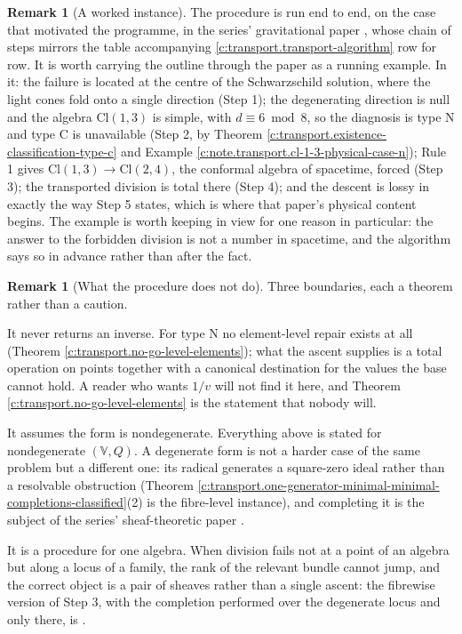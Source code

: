 \documentclass[11pt]{article}
\theoremstyle{definition}
\newtheorem{remark}[theorem]{Remark}
\theoremstyle{plain}
\providecommand{\Cl}{}\renewcommand{\Cl}{\mathrm{Cl}}
\begin{document}
\begin{remark}[A worked instance]\label{c:note.transport.worked-instance}
The procedure is run end to end, on the case that motivated the programme, in the series' gravitational paper \cite{ButlerT5}, whose chain of steps mirrors the table accompanying \ref{c:transport.transport-algorithm} row for row. It is worth carrying the outline through the paper as a running example. In it: the failure is located at the centre of the Schwarzschild solution, where the light cones fold onto a single direction (Step 1); the degenerating direction is null and the algebra $\Cl(1,3)$ is simple, with $d \equiv 6 \bmod 8$, so the diagnosis is type N and type C is unavailable (Step 2, by Theorem \ref{c:transport.existence-classification-type-c} and Example \ref{c:note.transport.cl-1-3-physical-case-n}); Rule 1 gives $\Cl(1,3) \to \Cl(2,4)$, the conformal algebra of spacetime, forced (Step 3); the transported division is total there (Step 4); and the descent is lossy in exactly the way Step 5 states, which is where that paper's physical content begins. The example is worth keeping in view for one reason in particular: the answer to the forbidden division is not a number in spacetime, and the algorithm says so in advance rather than after the fact.
\end{remark}

\begin{remark}[What the procedure does not do]\label{c:note.transport.what-procedure-does-not-do}
Three boundaries, each a theorem rather than a caution.

It never returns an inverse. For type N no element-level repair exists at all (Theorem \ref{c:transport.no-go-level-elements}); what the ascent supplies is a total operation on points together with a canonical destination for the values the base cannot hold. A reader who wants $1/v$ will not find it here, and Theorem \ref{c:transport.no-go-level-elements} is the statement that nobody will.

It assumes the form is nondegenerate. Everything above is stated for nondegenerate $(\mathbb{V},Q)$. A degenerate form is not a harder case of the same problem but a different one: its radical generates a square-zero ideal rather than a resolvable obstruction (Theorem \ref{c:transport.one-generator-minimal-minimal-completions-classified}(2) is the fibre-level instance), and completing it is the subject of the series' sheaf-theoretic paper \cite{ButlerT4}.

It is a procedure for one algebra. When division fails not at a point of an algebra but along a locus of a family, the rank of the relevant bundle cannot jump, and the correct object is a pair of sheaves rather than a single ascent: the fibrewise version of Step 3, with the completion performed over the degenerate locus and only there, is \cite[Thm.\ 4.4, Cor.\ 4.5]{ButlerT4}.
\end{remark}
\end{document}
